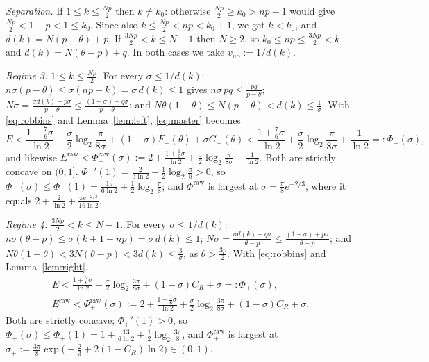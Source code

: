 \documentclass[11pt]{amsart}
\theoremstyle{remark}
\begin{document}
\emph{Separation.} If $1 \le k \le \frac{Np}{2}$ then $k \ne k_0$: otherwise $\frac{Np}{2} \ge k_0 > np - 1$ would give $\frac{Np}{2} < 1 - p < 1 \le k_0$. Since also $k \le \frac{Np}{2} < np < k_0 + 1$, we get $k < k_0$, and $d(k) = N(p - \theta) + p$. If $\frac{3Np}{2} < k \le N - 1$ then $N \ge 2$, so $k_0 \le np \le \frac{3Np}{2} < k$ and $d(k) = N(\theta - p) + q$. In both cases we take $v_{\mathrm{ub}} := 1/d(k)$.

\emph{Regime 3: $1 \le k \le \frac{Np}{2}$.} For every $\sigma \le 1/d(k)$: $n\sigma(p - \theta) \le \sigma(np - k) = \sigma\,d(k) \le 1$ gives $n\sigma\,pq \le \frac{pq}{p-\theta}$; $N\sigma = \frac{\sigma d(k) - p\sigma}{p - \theta} \le \frac{(1-\sigma) + q\sigma}{p - \theta}$; and $N\theta(1-\theta) \le N(p-\theta) < d(k) \le \frac1\sigma$. With \eqref{eq:robbins} and Lemma~\ref{lem:left}, \eqref{eq:master} becomes
\[
E < \frac{1 + \frac76 \sigma}{\ln 2} + \frac \sigma2\log_2\frac{\pi}{8\sigma} + (1-\sigma)F_-(\theta) + \sigma G_-(\theta) < \frac{1 + \frac76 \sigma}{\ln 2} + \frac \sigma2\log_2\frac{\pi}{8\sigma} + \frac{1}{\ln 2} =: \Phi_-(\sigma),
\]
and likewise $E^{\mathrm{raw}} < \Phi_-^{\mathrm{raw}}(\sigma) := 2 + \frac{1 + \frac16 \sigma}{\ln 2} + \frac \sigma2\log_2\frac{\pi}{8\sigma} + \frac{1}{\ln 2}$. Both are strictly concave on $(0,1]$. $\Phi_-'(1) = \frac{2}{3\ln 2} + \frac12\log_2\frac\pi8 > 0$, so $\Phi_-(\sigma) \le \Phi_-(1) = \frac{19}{6\ln 2} + \frac12\log_2\frac\pi8$; and $\Phi_-^{\mathrm{raw}}$ is largest at $\sigma = \frac\pi8 e^{-2/3}$, where it equals $2 + \frac{2}{\ln 2} + \frac{\pi e^{-2/3}}{16\ln 2}$.

\emph{Regime 4: $\frac{3Np}{2} < k \le N - 1$.} For every $\sigma \le 1/d(k)$: $n\sigma(\theta - p) \le \sigma(k + 1 - np) = \sigma\,d(k) \le 1$; $N\sigma = \frac{\sigma d(k) - q\sigma}{\theta - p} \le \frac{(1-\sigma) + p\sigma}{\theta - p}$; and $N\theta(1-\theta) < 3N(\theta - p) < 3d(k) \le \frac3\sigma$, as $\theta > \frac{3p}{2}$. With \eqref{eq:robbins} and Lemma~\ref{lem:right},
\[
\begin{gathered}
E < \frac{1 + \frac76 \sigma}{\ln 2} + \frac \sigma2\log_2\frac{3\pi}{8\sigma} + (1-\sigma)C_R + \sigma =: \Phi_+(\sigma),\\
E^{\mathrm{raw}} < \Phi_+^{\mathrm{raw}}(\sigma) := 2 + \frac{1 + \frac16 \sigma}{\ln 2} + \frac \sigma2\log_2\frac{3\pi}{8\sigma} + (1-\sigma)C_R + \sigma.
\end{gathered}
\]
Both are strictly concave; $\Phi_+'(1) > 0$, so $\Phi_+(\sigma) \le \Phi_+(1) = 1 + \frac{13}{6\ln 2} + \frac12\log_2\frac{3\pi}{8}$, and $\Phi_+^{\mathrm{raw}}$ is largest at $\sigma_+ := \frac{3\pi}{8}\exp\bigl(-\frac23 + 2(1 - C_R)\ln 2\bigr) \in (0,1)$.
\end{document}
